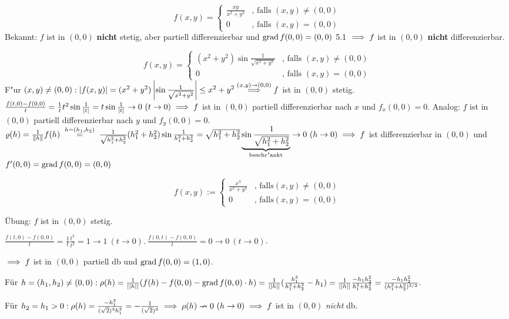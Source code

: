 \documentclass[a4paper,twoside,DIV15,BCOR12mm,chapterprefix=true,headings=twolinechapter]{scrbook}
\begin{document}
\begin{beispiele}
\item $$f(x,y)=\begin{cases}
\frac{xy}{x^2+y^2}&\text{, falls } (x,y)\ne(0,0)\\
0&\text{, falls } (x,y)=(0,0)
\end{cases}$$
Bekannt: $f$ ist in $(0,0)$ \textbf{nicht} stetig, aber partiell differenzierbar und $\mathop{\rm grad}\nolimits f(0,0)=(0,0)$ 5.1 $\implies f$ ist in $(0,0)$ \textbf{nicht} differenzierbar.
\item $$f(x,y)=\begin{cases}
(x^2+y^2)\sin\frac{1}{\sqrt{x^2+y^2}}&\text{, falls } (x,y)\ne(0,0)\\
0&\text{, falls }(x,y)=(0,0)
\end{cases}$$
F"ur $(x,y)\ne(0,0): \left|f(x,y)\right|=(x^2+y^2)\left|\sin\frac{1}{\sqrt{x^2+y^2}}\right|\le x^2+y^2\overset{(x,y)\to(0,0)}{\implies}f$ ist in $(0,0)$ stetig. $\frac{f(t,0)-f(0,0)}{t}=\frac{1}{t}t^2\sin\frac{1}{|t|}=t\sin\frac{1}{|t|}\to 0\ (t\to 0)\implies f$ ist in $(0,0)$ partiell differenzierbar nach $x$ und $f_x(0,0)=0$. Analog: $f$ ist in $(0,0)$ partiell differenzierbar nach $y$ und $f_y(0,0)=0$. $\varrho(h)=\frac{1}{\|h\|}f(h)\gleichwegen{h=(h_1,h_2)}\frac{1}{\sqrt{h_1^2+h_2^2}}(h_1^2+h_2^2)\sin\frac{1}{h_1^2+h_2^2}=\sqrt{h_1^2+h_2^2}\underbrace{\sin\frac{1}{\sqrt{h_1^2+h_2^2}}}_{\text{beschr"ankt}}\to 0\ (h\to 0)\folgt f$ ist differenzierbar in $(0,0)$ und $f'(0,0)=\mathop{\rm grad}\nolimits f(0,0)=(0,0)$

\item $$f(x,y) := \begin{cases}
\frac{x^3}{x^2+y^2}&\text{, falls} (x,y) \ne (0,0)\\
0&\text{, falls} (x,y) = (0,0)\end{cases}$$

\"Ubung: $f$ ist in $(0,0)$ stetig.

$\frac{f(t,0) - f(0,0)}{t} = \frac{1}{t} \frac{t^3}{t^2} = 1 \to 1\ (t \to 0).\ \frac{f(0,t) - f(0,0)}{t} = 0 \to 0\ (t \to 0)$.

$\implies f$ ist in $(0,0)$ partiell db und $\mathop{\rm grad}\nolimits f(0,0) = (1,0)$.

Für $h = (h_1,h_2) \ne (0,0): \rho(h) = \frac{1}{||h||}(f(h) - f(0,0) - \mathop{\rm grad}\nolimits f(0,0)\cdot h) = \frac{1}{||h||} (\frac{h_1^3}{h_1^2+h_2^2} - h_1) = \frac{1}{||h||} \frac{-h_1 h_2^2}{h_1^2 + h_2^2} =  \frac{-h_1 h_2^2}{(h_1^2 + h_2^2)^{3/2}}.$

Für $h_2 = h_1 > 0: \rho(h) = \frac{-h_1^3}{(\sqrt{2})^3 h_1^3} = - \frac{1}{(\sqrt{2})^3} \implies \rho(h) \nrightarrow 0\ (h \to 0) \implies f$ ist in $(0,0)$ \emph{nicht} db.
\end{beispiele}
\end{document}
